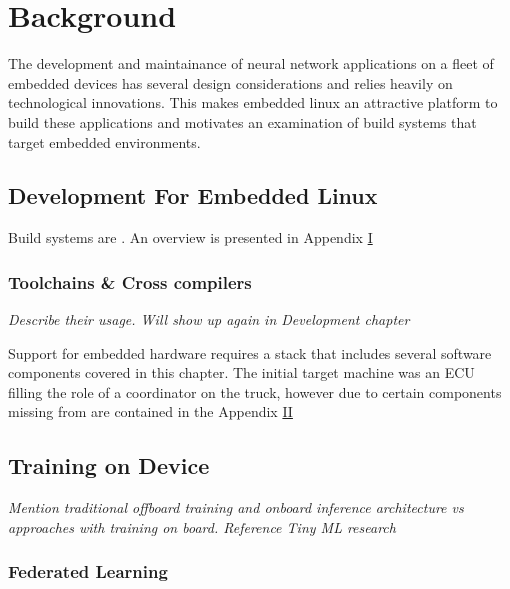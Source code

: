 
\chapter{Background}

The development and maintainance of neural network applications on a fleet of embedded devices has several design considerations and relies heavily on technological innovations. This makes embedded linux an attractive platform to build these applications and motivates an examination of build systems that target embedded environments.

\section[Development Process for Embedded Linux]{Development For Embedded Linux}

Build systems are . An overview is presented in Appendix \hyperref[buildsystems]{I}

\subsection[SDKs \& Compiler Toolchains]{Toolchains \& Cross compilers}
\textit{Describe their usage. Will show up again in Development chapter}

Support for embedded hardware requires a stack that includes several software components covered in this chapter. The initial target machine was an ECU filling the role of a coordinator on the truck, however due to certain components missing from are contained in the Appendix \hyperref[rtc-c300]{II}

\section{Training on Device}

\textit{Mention traditional offboard training and onboard inference architecture vs approaches with training on board. Reference Tiny ML research}

\subsection{Federated Learning}

